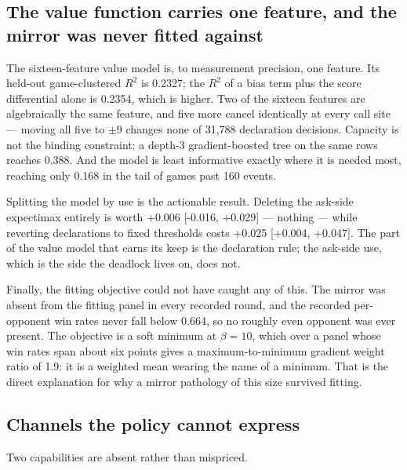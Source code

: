 \documentclass[11pt]{article}
\theoremstyle{definition}
\providecommand{\numValueRSq}{0.2327}
\providecommand{\numValueRSqScore}{0.2354}
\providecommand{\numValueRSqTree}{0.388}
\providecommand{\numValueRSqTail}{0.168}
\providecommand{\numDeadFeatureDecisions}{31{,}788}
\providecommand{\numAskSideValue}{+0.006}
\providecommand{\numAskSideCI}{-0.016, +0.029}
\providecommand{\numDeclSideValue}{+0.025}
\providecommand{\numDeclSideCI}{+0.004, +0.047}
\providecommand{\numSoftMinBeta}{10}
\providecommand{\numSoftMinRatio}{1.9}
\providecommand{\numDeadFeatureSwing}{9}
\providecommand{\numPanelFloor}{0.664}
\providecommand{\numTailEvents}{160}
\begin{document}
\subsection{The value function carries one feature, and the mirror was never fitted against}
\label{sec:diag-value}

The sixteen-feature value model is, to measurement precision, one feature. Its
held-out game-clustered $R^2$ is \numValueRSq{}; the $R^2$ of a bias term plus
the score differential alone is \numValueRSqScore{}, which is higher. Two of the
sixteen features are algebraically the same feature, and five more cancel
identically at every call site --- moving all five to $\pm\numDeadFeatureSwing$ changes none of
\numDeadFeatureDecisions{} declaration decisions. Capacity is not the binding
constraint: a depth-3 gradient-boosted tree on the same rows reaches
\numValueRSqTree{}. And the model is least informative exactly where it is needed
most, reaching only \numValueRSqTail{} in the tail of games past \numTailEvents{}
events.

Splitting the model by use is the actionable result. Deleting the ask-side
expectimax entirely is worth \numAskSideValue{} [\numAskSideCI] --- nothing ---
while reverting declarations to fixed thresholds costs \numDeclSideValue{}
[\numDeclSideCI]. The part of the value model that earns its keep is the
declaration rule; the ask-side use, which is the side the deadlock lives on,
does not.

Finally, the fitting objective could not have caught any of this. The mirror was
absent from the fitting panel in every recorded round, and the recorded
per-opponent win rates never fall below \numPanelFloor{}, so no roughly even opponent was
ever present. The objective is a soft minimum at $\beta = \numSoftMinBeta$, which
over a panel whose win rates span about six points gives a maximum-to-minimum
gradient weight ratio of \numSoftMinRatio{}: it is a weighted mean wearing the
name of a minimum. That is the direct explanation for why a mirror pathology of
this size survived fitting.

\subsection{Channels the policy cannot express}
\label{sec:diag-channels}

Two capabilities are absent rather than mispriced.
\end{document}

